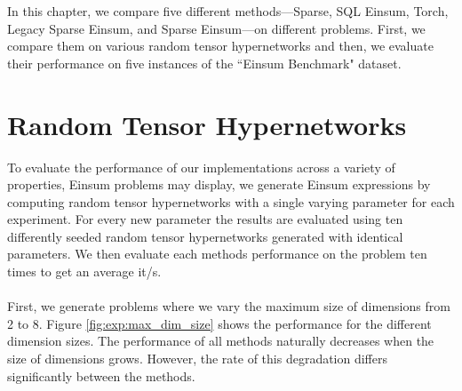 
In this chapter, we compare five different methods—Sparse, SQL Einsum, Torch, Legacy Sparse 
Einsum, and Sparse Einsum—on different problems. First, we compare them on various random
tensor hypernetworks and then, we evaluate their performance on five instances of the ``Einsum
Benchmark" \cite{einsum_benchmark} dataset.

\section{Random Tensor Hypernetworks}
To evaluate the performance of our implementations across a variety of properties, Einsum problems 
may display, we generate Einsum expressions by computing random tensor hypernetworks 
\cite{einsum_benchmark} with a single varying parameter for each experiment. For every new 
parameter the results are evaluated using ten differently seeded random tensor hypernetworks 
generated with identical parameters. We then evaluate each methods performance on the problem 
ten times to get an average it/s.
\\
\\
First, we generate problems where we vary the maximum size of dimensions from 2 to 8. 
Figure \ref{fig:exp:max_dim_size} shows the performance for the different dimension sizes. 
The performance of all methods naturally decreases when the size of dimensions grows. However, 
the rate of this degradation differs significantly between the methods.

